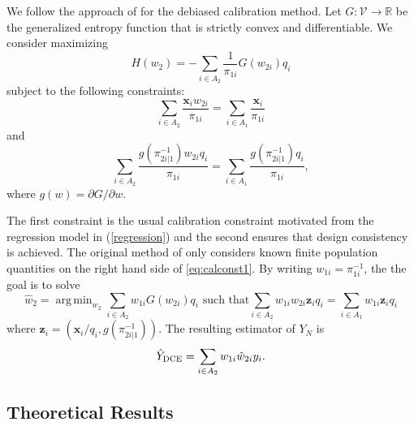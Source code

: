 \documentclass[12pt]{article}
\DeclareMathOperator*{\argmin}{arg\,min}
\newcommand{\R}{\mathbb{R}}
\renewcommand{\bf}[1]{\mathbf{#1}}
\begin{document}
We follow the approach of \cite{kwon2024debiased} for the debiased calibration
method.  Let $G: \mathcal{V} \to \R$ be the generalized entropy function that is
strictly convex and differentiable. We consider maximizing 
\begin{equation}\label{eq:primalloss}
  H(w_2) = - \sum_{i \in A_2} \frac{1}{\pi_{1i}} G(w_{2i}) q_i
\end{equation}
subject to the following constraints:
\begin{equation}\label{eq:calconst1}
  \sum_{i \in A_2} \frac{\bf x_i w_{2i}}{\pi_{1i}} = 
\sum_{i \in A_1} \frac{\bf x_i}{\pi_{1i}}
\end{equation}
and 
\begin{equation}\label{eq:calconst2}
  \sum_{i \in A_2} \frac{g(\pi_{2i|1}^{-1})w_{2i}q_i}{\pi_{1i}} = 
  \sum_{i \in A_1} \frac{g(\pi_{2i|1}^{-1})q_i}{\pi_{1i}}, 
\end{equation}
where $g(w) = \partial G / \partial w$. 

The first constraint is the usual calibration constraint motivated from the
regression model in (\ref{regression}) and the second
ensures that design consistency is achieved. 
The original method of \cite{kwon2024debiased} only considers known finite
population quantities on the right hand side of \eqref{eq:calconst1}.
By writing $w_{1i} = \pi_{1i}^{-1}$, the the goal is to solve
\begin{equation}\label{eq:primal}
  \hat w_2  = \argmin_{w_{2}} \sum_{i \in A_2} w_{1i} G(w_{2i}) q_i 
  \text{ such that}
  \sum_{i \in A_2} w_{1i} w_{2i} \bf z_i q_i = \sum_{i \in A_1} w_{1i} \bf z_i q_i
\end{equation}
where  $\bf z_i = (\bf x_i / q_i, g(\pi_{2i|1}^{-1}))$. The resulting 
estimator of $Y_N$ is 
\begin{equation}\label{eq:tpest}
\hat Y_{\rm DCE} = \sum_{i \in A_2} w_{1i} \hat w_{2i} y_i.
\end{equation}

\subsection{Theoretical Results}
\end{document}
